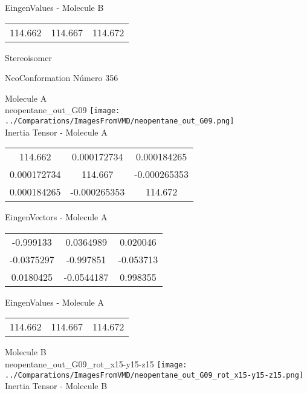\begin{multicols}{2}
\begin{center}
\vtab
 EingenValues - Molecule B     \\
\vtab
\begin{tabular}{|c c c|}
114.662	 & 	114.667	 & 	114.672	 \\
\end{tabular}

\end{center}
\end{multicols}
\begin{center}
\vtab
\vtab
\textcolor{NavyBlue}{\Large Stereoisomer}
\end{center}

 \newpage

\vtab[-2cm]
\begin{center}
{\large NeoConformation \tab Número 356}
\end{center}
\begin{multicols}{2}
\begin{center}

Molecule A \\ 
neopentane\_out\_G09
\texttt{[image: ../Comparations/ImagesFromVMD/neopentane\_out\_G09.png]}
\\
Inertia Tensor - Molecule A \\
\vtab

\begin{tabular}{|c c c|}
114.662	 & 	0.000172734	 & 	0.000184265	 \\
0.000172734	 & 	114.667	 & 	-0.000265353	 \\
0.000184265	 & 	-0.000265353	 & 	114.672
\end{tabular}

\vtab
 EingenVectors - Molecule A     \\
\vtab
\begin{tabular}{|c c c|}
-0.999133	 & 	0.0364989	 & 	0.020046	 \\
-0.0375297	 & 	-0.997851	 & 	-0.053713	 \\
0.0180425	 & 	-0.0544187	 & 	0.998355
\end{tabular}

\vtab
 EingenValues - Molecule A     \\
\vtab
\begin{tabular}{|c c c|}
114.662	 & 	114.667	 & 	114.672	 \\
\end{tabular}
\columnbreak

Molecule B \\ 
neopentane\_out\_G09\_rot\_x15-y15-z15
\texttt{[image: ../Comparations/ImagesFromVMD/neopentane\_out\_G09\_rot\_x15-y15-z15.png]}
\\
Inertia Tensor - Molecule B \\
\vtab


\end{center}
\end{multicols}
